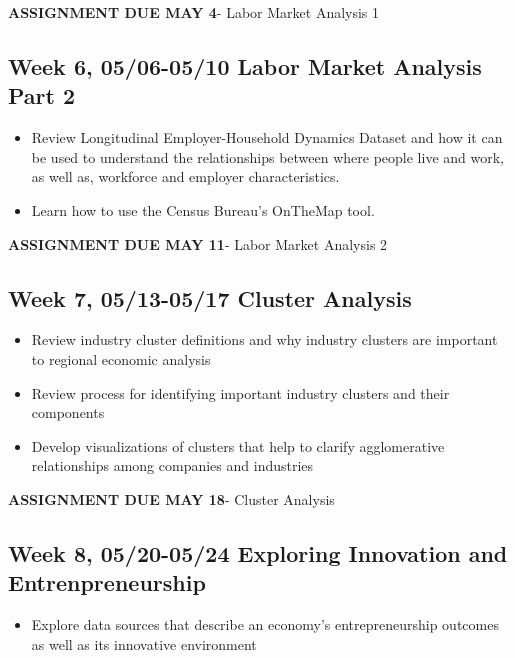 \documentclass[11pt,]{article}
\providecommand{\tightlist}{%
  \setlength{\itemsep}{0pt}\setlength{\parskip}{0pt}}
\begin{document}
\textbf{ASSIGNMENT DUE MAY 4}- Labor Market Analysis 1

\hypertarget{week-6-0506-0510-labor-market-analysis-part-2}{%
\subsection{Week 6, 05/06-05/10 Labor Market Analysis Part
2}\label{week-6-0506-0510-labor-market-analysis-part-2}}

\begin{itemize}
\item
  Review Longitudinal Employer-Household Dynamics Dataset and how it can
  be used to understand the relationships between where people live and
  work, as well as, workforce and employer characteristics.
\item
  Learn how to use the Census Bureau's OnTheMap tool.
\end{itemize}

\textbf{ASSIGNMENT DUE MAY 11}- Labor Market Analysis 2

\hypertarget{week-7-0513-0517-cluster-analysis}{%
\subsection{Week 7, 05/13-05/17 Cluster
Analysis}\label{week-7-0513-0517-cluster-analysis}}

\begin{itemize}
\item
  Review industry cluster definitions and why industry clusters are
  important to regional economic analysis
\item
  Review process for identifying important industry clusters and their
  components
\item
  Develop visualizations of clusters that help to clarify agglomerative
  relationships among companies and industries
\end{itemize}

\textbf{ASSIGNMENT DUE MAY 18}- Cluster Analysis

\hypertarget{week-8-0520-0524-exploring-innovation-and-entrenpreneurship}{%
\subsection{Week 8, 05/20-05/24 Exploring Innovation and
Entrenpreneurship}\label{week-8-0520-0524-exploring-innovation-and-entrenpreneurship}}

\begin{itemize}
\tightlist
\item
  Explore data sources that describe an economy's entrepreneurship
  outcomes as well as its innovative environment
\end{itemize}
\end{document}
